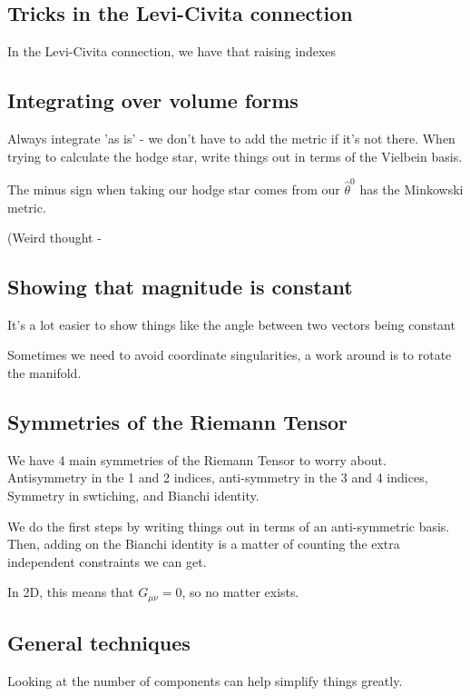 \subsection{Tricks in the Levi-Civita connection} 
In the Levi-Civita connection, we have that 
raising indexes 

\subsection{Integrating over volume forms} 
Always integrate 'as is'  - we don't have to add
the metric if it's not there. 
When trying to calculate the hodge star, 
write things out in terms of the Vielbein basis. 

The minus sign when taking our hodge star comes
from our $ \hat{\theta } ^ 0 $ has the Minkowski metric. 

(Weird thought - 

\subsection{Showing that magnitude is constant} 
It's a lot easier to 
show things like the angle between two 
vectors being constant 

Sometimes we need to avoid coordinate singularities, 
a work around is to rotate the manifold. 

\subsection{Symmetries of the Riemann Tensor} 
We have 4 main symmetries of the Riemann Tensor to worry about. 
Antisymmetry in the 1 and 2 indices, anti-symmetry in the 3 and 4 indices, 
Symmetry in swtiching, and Bianchi identity.

We do the first steps by writing things out in
terms of an anti-symmetric basis. Then, adding 
on the Bianchi identity is a matter of counting the extra independent 
constraints we can get.

In 2D, this means that $G_{ \mu \nu} =0 $, so no
matter exists. 

\subsection{General techniques} 
Looking at the number of components 
can help simplify things greatly. 
